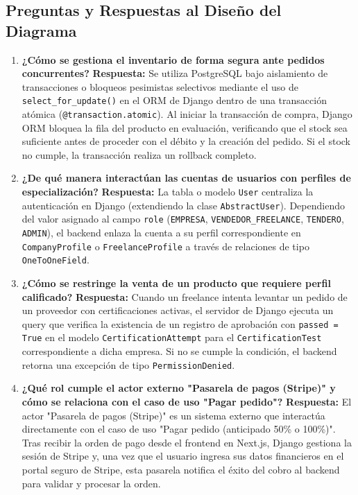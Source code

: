 \documentclass[12pt,spanish,a4paper]{report}
\begin{document}
\subsection*{Preguntas y Respuestas al Diseño del Diagrama}

\begin{enumerate}
    \item \textbf{¿Cómo se gestiona el inventario de forma segura ante pedidos concurrentes?}
    \textbf{Respuesta:} Se utiliza PostgreSQL bajo aislamiento de transacciones o bloqueos pesimistas selectivos mediante el uso de \lstinline{select_for_update()} en el ORM de Django dentro de una transacción atómica (\lstinline{@transaction.atomic}). Al iniciar la transacción de compra, Django ORM bloquea la fila del producto en evaluación, verificando que el stock sea suficiente antes de proceder con el débito y la creación del pedido. Si el stock no cumple, la transacción realiza un rollback completo.
    \item \textbf{¿De qué manera interactúan las cuentas de usuarios con perfiles de especialización?}
    \textbf{Respuesta:} La tabla o modelo \lstinline{User} centraliza la autenticación en Django (extendiendo la clase \lstinline{AbstractUser}). Dependiendo del valor asignado al campo \lstinline{role} (\lstinline{EMPRESA}, \lstinline{VENDEDOR_FREELANCE}, \lstinline{TENDERO}, \lstinline{ADMIN}), el backend enlaza la cuenta a su perfil correspondiente en \lstinline{CompanyProfile} o \lstinline{FreelanceProfile} a través de relaciones de tipo \lstinline{OneToOneField}.
    \item \textbf{¿Cómo se restringe la venta de un producto que requiere perfil calificado?}
    \textbf{Respuesta:} Cuando un freelance intenta levantar un pedido de un proveedor con certificaciones activas, el servidor de Django ejecuta un query que verifica la existencia de un registro de aprobación con \lstinline{passed = True} en el modelo \lstinline{CertificationAttempt} para el \lstinline{CertificationTest} correspondiente a dicha empresa. Si no se cumple la condición, el backend retorna una excepción de tipo \lstinline{PermissionDenied}.
    \item \textbf{¿Qué rol cumple el actor externo "Pasarela de pagos (Stripe)" y cómo se relaciona con el caso de uso "Pagar pedido"?}
    \textbf{Respuesta:} El actor "Pasarela de pagos (Stripe)" es un sistema externo que interactúa directamente con el caso de uso "Pagar pedido (anticipado 50\% o 100\%)". Tras recibir la orden de pago desde el frontend en Next.js, Django gestiona la sesión de Stripe y, una vez que el usuario ingresa sus datos financieros en el portal seguro de Stripe, esta pasarela notifica el éxito del cobro al backend para validar y procesar la orden.

\end{enumerate}
\end{document}
